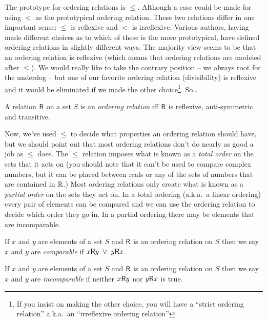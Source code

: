 The prototype for ordering relations is $\leq$.  Although a case
could be made for using $<$ as the prototypical ordering relation.  
These two relations differ in one important sense: $\leq$ is reflexive
and $<$ is irreflexive.  Various authors, having made different 
choices as to which of these is the more prototypical, have
defined ordering relations in slightly different ways.  The 
majority view seems to be that an ordering relation is
reflexive (which means that 
ordering relations are modeled after $\leq$).  
We would really like to take the contrary position -- we always
root for the underdog -- but one of our favorite ordering
relation (divisibility) is reflexive and it would be eliminated
if we made the other choice\footnote{If you insist on making the other %
choice, you will have a ``strict ordering relation'' a.k.a.\ an ``irreflexive %
ordering relation''}.  So\ldots

\begin{defi}
A relation $\mbox{\textsf R}$ on a set $S$ is an 
\emph{ordering relation}
iff $\mbox{\textsf R}$ is reflexive, anti-symmetric and transitive.
\end{defi}

Now, we've used $\leq$ to decide what properties an ordering relation
should have, but we should point out that most ordering relations
don't do nearly as good a job as $\leq$ does.  The $\leq$ relation
imposes what is known as a \emph{total order}
on the sets that it acts on (you should note that it can't be used
to compare complex numbers, but it can be placed between reals or
any of the sets of numbers that are contained in ${\mathbb R}$.)  Most
ordering relations only create what is known as a 
\emph{partial order} on the sets they act on.  In a total ordering
(a.k.a.\ a linear ordering) every pair of elements can be compared
and we can use the ordering relation to decide which order they go
in.  In a partial ordering there may be elements that are incomparable.

\begin{defi}
If $x$ and $y$ are elements of a set $S$ and $\mbox{\textsf R}$ is an ordering
relation on $S$ then we say $x$ and $y$ are \emph{comparable} if
$x\mbox{\textsf R} y \; \lor \; y\mbox{\textsf R} x$.
\end{defi}

\begin{defi}
If $x$ and $y$ are elements of a set $S$ and $\mbox{\textsf R}$ is an ordering
relation on $S$ then we say $x$ and $y$ are \emph{incomparable} if
neither $x\mbox{\textsf R} y$ nor $y\mbox{\textsf R} x$ is true.
\end{defi}

